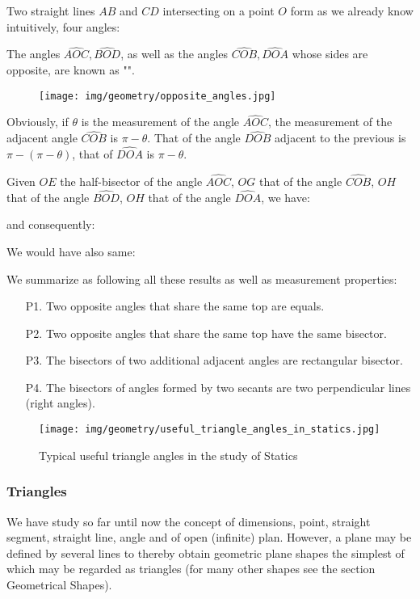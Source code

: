 	Two straight lines $AB$ and $CD$ intersecting on a point $O$ form as we already know intuitively, four angles:
	
	The angles $\widehat{AOC},\widehat{BOD}$, as well as the angles $\widehat{COB},\widehat{DOA}$ whose sides are opposite, are known as "".
	\begin{figure}[H]
		\centering
		\texttt{[image: img/geometry/opposite\_angles.jpg]}
	\end{figure}
	Obviously, if $\theta$ is the measurement of the angle $\widehat{AOC}$, the measurement of the adjacent angle $\widehat{COB}$ is $\pi-\theta$. That of the angle $\widehat{DOB}$ adjacent to the previous is $\pi-(\pi-\theta)$, that of $\widehat{DOA}$ is $\pi-\theta$.
	
	Given $OE$ the half-bisector of the angle $\widehat{AOC}$, $OG$ that of the angle $\widehat{COB}$, $OH$ that of the angle $\widehat{BOD}$, $OH$ that of the angle $\widehat{DOA}$, we have:
	
	and consequently:
	
	We would have also same:
	
	We summarize as following all these results as well as measurement properties:
	\begin{enumerate}
		\item[P1.] Two opposite angles that share the same top are equals.
		\item[P2.] Two opposite angles that share the same top have the same bisector.
		\item[P3.] The bisectors of two additional adjacent angles are rectangular bisector.
		\item[P4.] The bisectors of angles formed by two secants are two perpendicular lines (right angles).
	\end{enumerate}
	\begin{figure}[H]
		\centering
		\texttt{[image: img/geometry/useful\_triangle\_angles\_in\_statics.jpg]}
		\caption{Typical useful triangle angles in the study of Statics}
	\end{figure}
	
	\pagebreak
	\subsubsection{Triangles}
	We have study so far until now the concept of dimensions, point, straight segment, straight line, angle and of open (infinite) plan. However, a plane may be defined by several lines to thereby obtain geometric plane shapes  the simplest of which may be regarded as triangles (for many other shapes see the section Geometrical Shapes).

